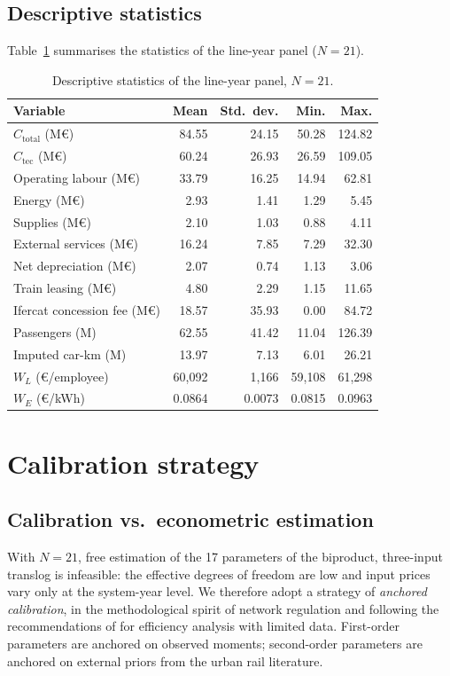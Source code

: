 \documentclass[11pt,a4paper]{article}
\begin{document}
\subsection{Descriptive statistics}
Table~\ref{tab:descr} summarises the statistics of the line-year panel
($N=21$).

\begin{table}[H]
\centering
\caption{Descriptive statistics of the line-year panel, $N=21$.}
\label{tab:descr}
\footnotesize
\begin{tabular}{lrrrr}
\toprule
Variable & Mean & Std.\ dev. & Min. & Max. \\
\midrule
$C_{\text{total}}$ (M\euro{}) & 84.55 & 24.15 & 50.28 & 124.82 \\
$C_{\text{tec}}$ (M\euro{}) & 60.24 & 26.93 & 26.59 & 109.05 \\
Operating labour (M\euro{}) & 33.79 & 16.25 & 14.94 & 62.81 \\
Energy (M\euro{}) & 2.93 & 1.41 & 1.29 & 5.45 \\
Supplies (M\euro{}) & 2.10 & 1.03 & 0.88 & 4.11 \\
External services (M\euro{}) & 16.24 & 7.85 & 7.29 & 32.30 \\
Net depreciation (M\euro{}) & 2.07 & 0.74 & 1.13 & 3.06 \\
Train leasing (M\euro{}) & 4.80 & 2.29 & 1.15 & 11.65 \\
Ifercat concession fee (M\euro{}) & 18.57 & 35.93 & 0.00 & 84.72 \\
Passengers (M) & 62.55 & 41.42 & 11.04 & 126.39 \\
Imputed car-km (M) & 13.97 & 7.13 & 6.01 & 26.21 \\
$W_L$ (\euro{}/employee) & 60{,}092 & 1{,}166 & 59{,}108 & 61{,}298 \\
$W_E$ (\euro{}/kWh) & 0.0864 & 0.0073 & 0.0815 & 0.0963 \\
\bottomrule
\end{tabular}
\end{table}

\section{Calibration strategy}
\label{sec:calib}

\subsection{Calibration vs.\ econometric estimation}
With $N=21$, free estimation of the 17 parameters of the biproduct,
three-input translog is infeasible: the effective degrees of freedom are
low and input prices vary only at the system-year level. We therefore
adopt a strategy of \emph{anchored calibration}, in the methodological
spirit of network regulation \citep{joskow2008,angristpischke2014} and
following the recommendations of \citet{coelli2005} for efficiency
analysis with limited data. First-order parameters are anchored on
observed moments; second-order parameters are anchored on external priors
from the urban rail literature.
\end{document}
